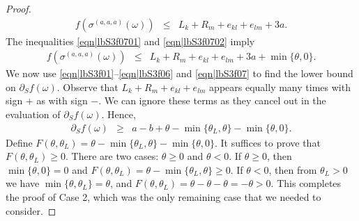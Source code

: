 \documentclass[10pt,a4paper]{amsart}
\begin{document}
\begin{proof}
\begin{eqnarray}
f(\sigma^{(a,a,a)}(\omega))&\leq& L_k+R_m+e_{kl}+e_{lm}+3a.\label{eqn|lbS3f0702}
\end{eqnarray}
The inequalities \eqref{eqn|lbS3f0701} and \eqref{eqn|lbS3f0702} imply 
\begin{eqnarray}
f(\sigma^{(a,a,a)}(\omega))&\leq& L_k+R_m+e_{kl}+e_{lm}+3a+\min\{\theta,0\}. \label{eqn|lbS3f07}
\end{eqnarray}
We now use \eqref{eqn|lbS3f01}--\eqref{eqn|lbS3f06} and \eqref{eqn|lbS3f07} to find the lower bound on $\partial_Sf(\omega)$. Observe that $L_k+R_m+e_{kl}+e_{lm}$ appears equally many times with sign $+$ as with sign $-$. We can ignore these terms as they cancel out in the evaluation of $\partial_Sf(\omega)$. Hence, 
\begin{eqnarray}
\partial_Sf(\omega)&\geq&   a    -b+\theta -\min\{\theta_L,\theta\} -\min\{\theta,0\}. \label{eqn|lbS3AlmostDone}
\end{eqnarray}
Define
$F(\theta,\theta_L)=\theta- \min\{\theta_L,\theta\}-\min\{\theta,0\}$. It suffices to prove that $F(\theta,\theta_L)\geq 0$. 
There are two cases: $\theta\geq 0$ and $\theta<0$. If $\theta\geq 0$, then $\min\{\theta,0\}=0$ and $F(\theta,\theta_L)=\theta-\min\{\theta_L,\theta\}\geq 0$. 
If $\theta <0$, then from $\theta_L>0$ we have $\min\{\theta,\theta_L\}=\theta$, and  
$F(\theta,\theta_L)=\theta-\theta-\theta=-\theta>0$. This completes the proof of Case 2, which was the only remaining case that we needed to consider.
\end{proof}
\end{document}
